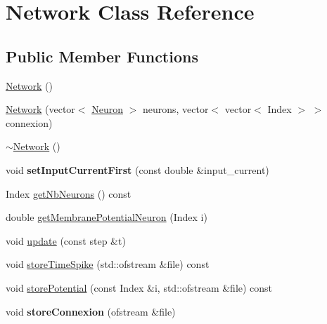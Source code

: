 \hypertarget{classNetwork}{\section{Network Class Reference}
\label{classNetwork}
}
\subsection*{Public Member Functions}
\begin{DoxyCompactItemize}
\item 
\hyperlink{classNetwork_a3cc2fb4f8fa4d507077e8da85ce5a1c8}{Network} ()
\item 
\hyperlink{classNetwork_ad037e83127d04659334234b82274da95}{Network} (vector$<$ \hyperlink{classNeuron}{Neuron} $>$ neurons, vector$<$ vector$<$ Index $>$ $>$ connexion)
\item 
\hyperlink{classNetwork_a7a4e19cdb4bf0c7ecf82baa643831492}{$\sim$\-Network} ()
\item 
\hypertarget{classNetwork_ad48e7a97a427588226ea445bc5e9a9ff}{void {\bfseries set\-Input\-Current\-First} (const double \&input\-\_\-current)}\label{classNetwork_ad48e7a97a427588226ea445bc5e9a9ff}

\item 
Index \hyperlink{classNetwork_a91b4de88cf516e2971e064fc38e9c938}{get\-Nb\-Neurons} () const 
\item 
double \hyperlink{classNetwork_aefca6fc0d764730dc4a23df82eb15320}{get\-Membrane\-Potential\-Neuron} (Index i)
\item 
void \hyperlink{classNetwork_ab79d5782d33c2cf69f7a2a00bbc534db}{update} (const step \&t)
\item 
void \hyperlink{classNetwork_ad69a9355cb163b97e3d8efede48c1433}{store\-Time\-Spike} (std\-::ofstream \&file) const 
\item 
void \hyperlink{classNetwork_a0a397c35415b2f9255969a13c80af9ec}{store\-Potential} (const Index \&i, std\-::ofstream \&file) const 
\item 
\hypertarget{classNetwork_a7aa4884498278f1b18c4f0c050592b95}{void {\bfseries store\-Connexion} (ofstream \&file)}\label{classNetwork_a7aa4884498278f1b18c4f0c050592b95}

\end{DoxyCompactItemize}


